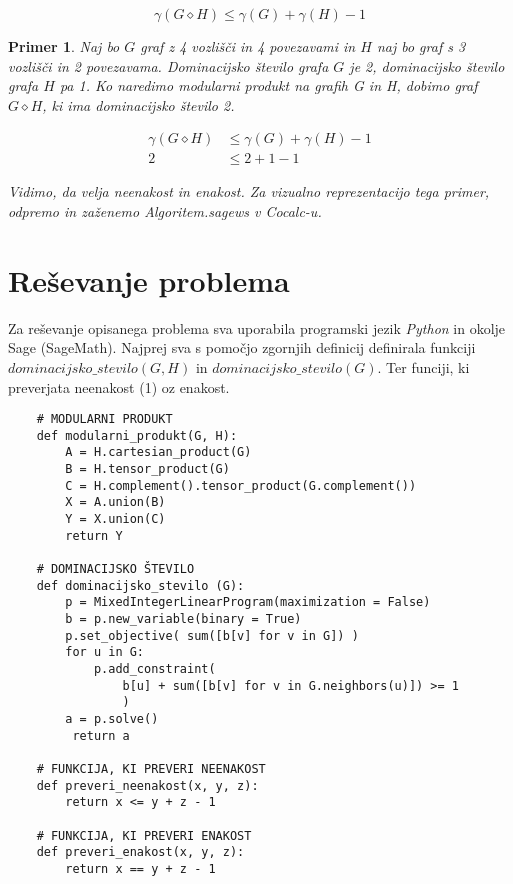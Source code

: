 \documentclass[a4paper,12pt]{article}
\newtheorem{primer}{Primer}
\begin{document}
\begin{equation}
    \gamma(G\diamond H) \leq \gamma (G) + \gamma (H) - 1
\end{equation}

\begin{primer}
    Naj bo $G$ graf z 4 vozlišči in 4 povezavami in $H$ naj bo graf s 3 vozlišči in 
    2 povezavama. Dominacijsko število grafa $G$ je 2, dominacijsko število grafa $H$ pa 1. Ko naredimo modularni produkt na grafih G in H, 
    dobimo graf $G \diamond H$, ki ima dominacijsko število 2. 

    \begin{align*} 
        \gamma(G\diamond H) &\leq \gamma (G) + \gamma (H) - 1 \\ 
        2 &\leq 2 + 1 - 1
    \end{align*}
    
    \noindent Vidimo, da velja neenakost in enakost. Za vizualno reprezentacijo tega primer,
    odpremo in zaženemo Algoritem.sagews v Cocalc-u.

\end{primer}

\section{Reševanje problema}
Za reševanje opisanega problema sva uporabila programski jezik \emph{Python} in okolje Sage (SageMath).
Najprej sva s pomočjo zgornjih definicij definirala funkciji $dominacijsko\_stevilo(G, H)$ in $dominacijsko\_stevilo(G)$.
Ter funciji, ki preverjata neenakost (1) oz enakost.

\begin{verbatim}
    # MODULARNI PRODUKT
    def modularni_produkt(G, H):
        A = H.cartesian_product(G)
        B = H.tensor_product(G)
        C = H.complement().tensor_product(G.complement())
        X = A.union(B)
        Y = X.union(C)
        return Y
    
    # DOMINACIJSKO ŠTEVILO
    def dominacijsko_stevilo (G):
        p = MixedIntegerLinearProgram(maximization = False)
        b = p.new_variable(binary = True)
        p.set_objective( sum([b[v] for v in G]) )
        for u in G:
            p.add_constraint( 
                b[u] + sum([b[v] for v in G.neighbors(u)]) >= 1 
                )
        a = p.solve()
         return a

    # FUNKCIJA, KI PREVERI NEENAKOST
    def preveri_neenakost(x, y, z):
        return x <= y + z - 1

    # FUNKCIJA, KI PREVERI ENAKOST 
    def preveri_enakost(x, y, z):
        return x == y + z - 1
\end{verbatim}
\end{document}
